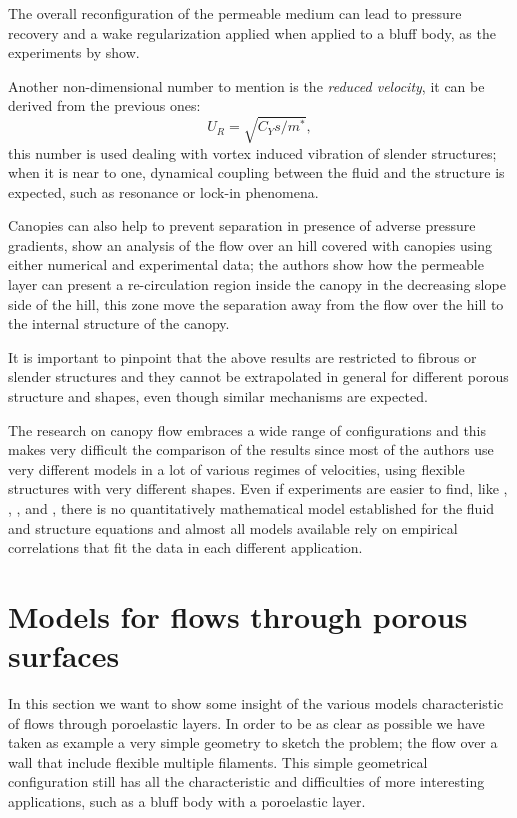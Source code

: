 The overall reconfiguration of the permeable medium can lead to pressure recovery and a wake regularization applied when applied to a bluff body, as the experiments by \citet{gosselin2011drag} show.

Another non-dimensional number to mention is the \textit{reduced velocity}, it can be derived from the previous ones:
$$ U_R = \sqrt{C_Y s / m^*},$$
this number is used dealing with vortex induced vibration of slender structures; when it is near to one, dynamical coupling between the fluid and the structure is expected, such as resonance or lock-in phenomena.

Canopies can also help to prevent separation in presence of adverse pressure gradients, \citet{belcher2012wind} show an analysis of the flow over an hill covered with canopies using either numerical and experimental data; the authors show how the permeable layer can present a re-circulation region inside the canopy in the decreasing slope side of the hill, this zone move the separation away from the flow over the hill to the internal structure of the canopy.

It is important to pinpoint that the above results are restricted to fibrous or slender structures and they cannot be extrapolated in general for different porous structure and shapes, even though similar mechanisms are expected.

The research on canopy flow embraces a wide range of configurations and this makes very difficult the comparison of the results since most of the authors use very different models in a lot of various regimes of velocities, using flexible structures with very different shapes.
Even if experiments are easier to find, like \citet{segalini2011experimental}, \citet{segalini2013scaling}, \citet{maza2013coupled}, \citet{barsu2016drag} and \citet{alvarado2017nature}, there is no quantitatively mathematical model established for the fluid and structure equations and almost all models available rely on empirical correlations that fit the data in each different application.


\section{Models for flows through porous surfaces}

In this section we want to show some insight of the various models characteristic of flows through poroelastic layers.
In order to be as clear as possible we have taken as example a very simple geometry to sketch the problem; the flow over a wall that include flexible multiple filaments. 
This simple geometrical configuration still has all the characteristic and difficulties of more interesting applications, such as a bluff body with a poroelastic layer.

